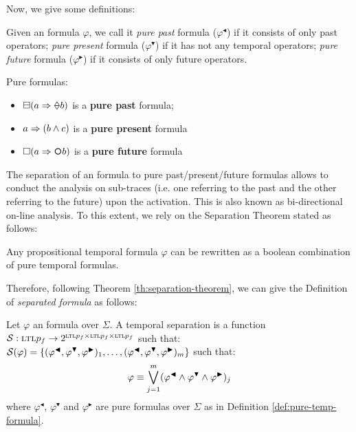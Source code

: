 Now, we give some definitions:
\begin{definition}\citep{gabbay1989declarative}\label{def:pure-temp-formula}
Given an \LTLp formula $\varphi$, we call it \emph{pure past} formula ($\varphi^\blacktriangleleft$) if it consists of only past operators; \emph{pure present} formula ($\varphi^\blacktriangledown$) if it has not any temporal operators; \emph{pure future} formula ($\varphi^\blacktriangleright$) if it consists of only future operators.
\end{definition}
\begin{example}\label{ex:pure-formulas-examples}
Pure formulas:
\begin{itemize}
\item $\boxminus(a \Rightarrow \Once b)$ is a \textbf{pure past} formula;
\item $a \Rightarrow (b \lAND c)$ is a \textbf{pure present} formula
\item $\Box(a \Rightarrow \Next b)$ is a \textbf{pure future} formula
\end{itemize}
\end{example}
The separation of an \LTLp formula to pure past/present/future formulas allows to conduct the analysis on sub-traces (i.e. one referring to the past and the other referring to the future) upon the activation. This is also known as bi-directional on-line analysis. To this extent, we rely on the Separation Theorem stated as follows:
\begin{theorem}\citep{gabbay1989declarative}\label{th:separation-theorem}
Any propositional temporal formula $\varphi$ can be rewritten as a boolean combination of pure temporal formulas.
\end{theorem}
Therefore, following Theorem \ref{th:separation-theorem}, we can give the Definition of \textit{separated formula} as follows:
\begin{definition}\label{def:separated-formula}
Let  $\varphi$ an \LTLp formula over $\Sigma$. A temporal separation is a function $\S: \textsc{ltl}p_f  \rightarrow 2^{\textsc{ltl}p_f \times \textsc{ltl}p_f 	\times \textsc{ltl}p_f}$ such that: $\S(\varphi) = \{(\varphi^{\blacktriangleleft},\varphi^{\blacktriangledown},\varphi^{\blacktriangleright})_1,\dots,(\varphi^{\blacktriangleleft},\varphi^{\blacktriangledown},\varphi^{\blacktriangleright})_m\}$ such that:
\begin{equation}\label{eq:separated-formulas}
\varphi \equiv \bigvee^{m}_{j=1} (\varphi^{\blacktriangleleft} \lAND \varphi^{\blacktriangledown} \lAND \varphi^{\blacktriangleright})_j
\end{equation}
where $\varphi^\blacktriangleleft$, $\varphi^\blacktriangledown$ and $\varphi^\blacktriangleright$ are pure formulas over $\Sigma$ as in Definition \ref{def:pure-temp-formula}.
\end{definition}
